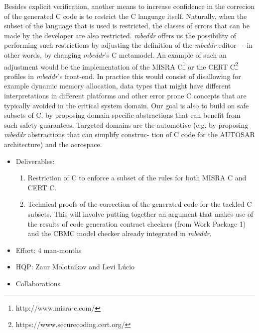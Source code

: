 Besides explicit verification, another means to increase confidence in the
correcion of the generated C code is to restrict the C language itself.
Naturally, when the subset of the language that is used is restricted, the
classes of errors that can be made by the developer are also restricted. \emph{mbeddr}
offers us the possibility of performing such restrictions by adjusting the
definition of the \emph{mbeddr} editor –- in other words, by changing \emph{mbeddr}’s C
metamodel. An example of such an adjustment would be the implementation of the
MISRA C\footnote{http://www.misra-c.com/} or the CERT
C\footnote{https://www.securecoding.cert.org/} profiles in \emph{mbeddr}’s front-end.
In practice this would consist of disallowing for example dynamic memory
allocation, data types that might have different interpretations in different
platforms and other error prone C concepts that are typically avoided in the
critical system domain.
Our goal is also to build on safe subsets of C, by proposing domain-specific
abstractions that can benefit from such safety guarantees. Targeted domains are
the automotive (e.g. by proposing \emph{mbeddr} abstractions that can simplify
construc- tion of C code for the AUTOSAR architecture) and the
aerospace.

\begin{itemize}
  \item Deliverables:
  \begin{enumerate}
    \item Restriction of C to enforce a subset of the rules for both MISRA C and
    CERT C.
\item Technical proofs of the correction of the generated code for the tackled C
subsets. This will involve putting together an argument that makes use of the
results of code generation contract checkers (from Work Package 1) and the CBMC
model checker already integrated in \emph{mbeddr}.
  \end{enumerate}
  \item Effort: 4 man-months
  \item HQP: Zaur Molotnikov and Levi L\'ucio
  \item Collaborations
\end{itemize}
